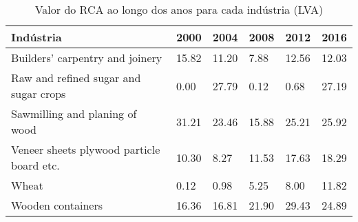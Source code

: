 \begin{table}
\centering
\caption{Valor do RCA ao longo dos anos para cada indústria (LVA)}
\begin{tabular}{p{6cm}p{1.5cm}p{1.5cm}p{1.5cm}p{1.5cm}p{1.5cm}}
\toprule
                                Indústria &  2000 &  2004 &  2008 &  2012 &  2016 \\
\midrule
          Builders' carpentry and joinery & 15.82 & 11.20 &  7.88 & 12.56 & 12.03 \\
    Raw and refined sugar and sugar crops &  0.00 & 27.79 &  0.12 &  0.68 & 27.19 \\
           Sawmilling and planing of wood & 31.21 & 23.46 & 15.88 & 25.21 & 25.92 \\
Veneer sheets plywood particle board etc. & 10.30 &  8.27 & 11.53 & 17.63 & 18.29 \\
                                    Wheat &  0.12 &  0.98 &  5.25 &  8.00 & 11.82 \\
                        Wooden containers & 16.36 & 16.81 & 21.90 & 29.43 & 24.89 \\
\bottomrule
\end{tabular}
\end{table}
